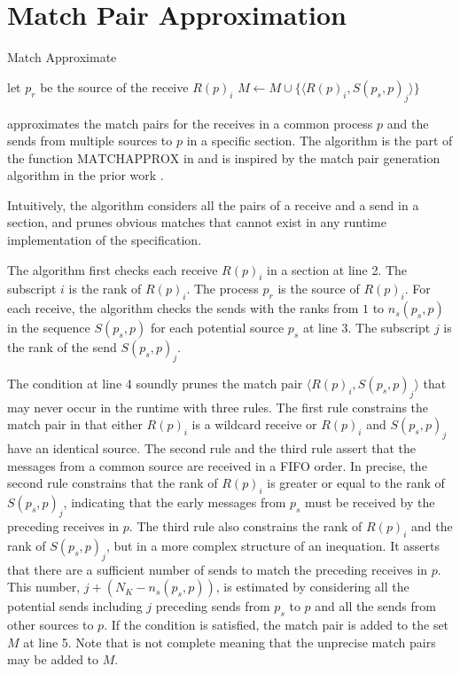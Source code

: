 \section{Match Pair Approximation}

\begin{algorithm}
\caption{Match Approximate}\label{algo:match}
\begin{algorithmic}[1]
\State let $p_r$ be the source of the receive $R(p)_i$
\State $M\gets M\cup\{\langle R(p)_i,S(p_s,p)_j \rangle\}$
\EndIf
\EndFor
\EndFor
\end{algorithmic}
\end{algorithm}

 approximates the match pairs for the receives in a common process $p$ and the sends from multiple sources to $p$ in a specific section. 
The algorithm is the part of the function $\mathrm{MATCHAPPROX}$ in  and is inspired by the match pair generation algorithm in the prior work \cite{}. 

Intuitively, the algorithm considers all the pairs of a receive and a send in a section, and prunes obvious matches that cannot exist in any runtime implementation of the specification.

The algorithm first checks each receive $R(p)_i$ in a section at line 2. The subscript $i$ is the rank of $R(p)_i$. The process $p_r$ is the source of $R(p)_i$.
For each receive, the algorithm checks the sends with the ranks from $1$ to $n_s(p_s,p)$ in the sequence $S(p_s,p)$ for each potential source $p_s$ at line 3.
The subscript $j$ is the rank of the send $S(p_s,p)_j$. 

The condition at line 4 soundly prunes the match pair $\langle R(p)_i,S(p_s,p)_j\rangle$ that may never occur in the runtime with three rules. The first rule constrains the match pair in that either $R(p)_i$ is a wildcard receive or $R(p)_i$ and $S(p_s,p)_j$ have an identical source. The second rule and the third rule assert that the messages from a common source are received in a FIFO order. In precise, the second rule constrains that the rank of $R(p)_i$ is greater or equal to the rank of $S(p_s,p)_j$, indicating that the early messages from $p_s$ must be received by the preceding receives in $p$. The third rule also constrains the rank of $R(p)_i$ and the rank of $S(p_s,p)_j$, but in a more complex structure of an inequation. It asserts that there are a sufficient number of sends to match the preceding receives in $p$. This number, $j + (N_K - \mathit{n_s}(p_s,p))$, is estimated by considering all the potential sends including $j$ preceding sends from $p_s$ to $p$ and all the sends from other sources to $p$.
If the condition is satisfied, the match pair is added to the set $M$ at line 5. Note that  is not complete meaning that the unprecise match pairs may be added to $M$.

